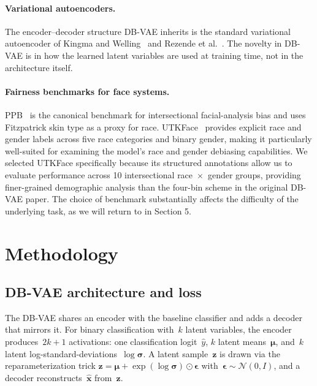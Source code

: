 \documentclass[10pt,twocolumn]{article}
\begin{document}
\paragraph{Variational autoencoders.}
The encoder--decoder structure DB-VAE inherits is the standard variational autoencoder of Kingma and Welling~\cite{kingma2013vae} and Rezende et al.~\cite{rezende2014stochastic}. The novelty in DB-VAE is in how the learned latent variables are used at training time, not in the architecture itself.

\paragraph{Fairness benchmarks for face systems.}
PPB~\cite{buolamwini2018gendershades} is the canonical benchmark for intersectional facial-analysis bias and uses Fitzpatrick skin type as a proxy for race.
UTKFace~\cite{zhang2017utkface} provides explicit race and gender labels across five race categories and binary gender, making it particularly well-suited for examining the model's race and gender debiasing capabilities.
We selected UTKFace specifically because its structured annotations allow us to evaluate performance across 10 intersectional race~$\times$~gender groups, providing finer-grained demographic analysis than the four-bin scheme in the original DB-VAE paper.
The choice of benchmark substantially affects the difficulty of the underlying task, as we will return to in Section 5.

\section{Methodology}

\subsection{DB-VAE architecture and loss}
\label{sec:arch}

The DB-VAE shares an encoder with the baseline classifier and adds a
decoder that mirrors it. For binary classification with~$k$ latent
variables, the encoder produces~$2k+1$ activations: one classification
logit~$\hat{y}$, $k$ latent means~$\boldsymbol{\mu}$, and~$k$ latent
log-standard-deviations~$\log\boldsymbol{\sigma}$. A latent
sample~$\mathbf{z}$ is drawn via the reparameterization trick
$\mathbf{z} = \boldsymbol{\mu} + \exp(\log\boldsymbol{\sigma}) \odot
\boldsymbol{\epsilon}$ with~$\boldsymbol{\epsilon} \sim \mathcal{N}(0, I)$,
and a decoder reconstructs~$\hat{\mathbf{x}}$ from~$\mathbf{z}$.
\end{document}
